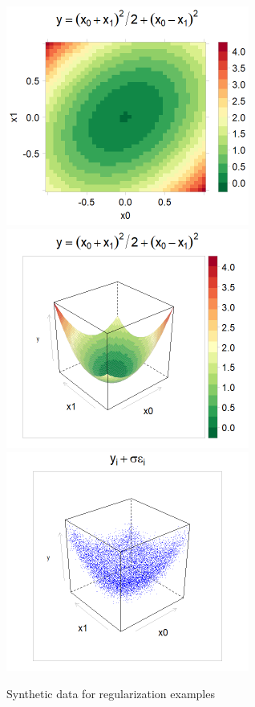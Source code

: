 \documentclass[10pt,openany]{article}
\numberwithin{definition}{section}
\numberwithin{example}{section}
\numberwithin{equation}{section}
\numberwithin{figure}{section}
\begin{document}
\begin{figure}
\noindent \begin{centering}
 \includegraphics[width=80mm]{../fig/reg-true-levelplot}~
 \includegraphics[width=80mm]{../fig/reg-true-wireframe}~
 \includegraphics[width=80mm]{../fig/rpart-training-data}
\par\end{centering}

\protect\caption{\label{fig:synthetic-data}Synthetic data for regularization examples}
\end{figure}
\end{document}
